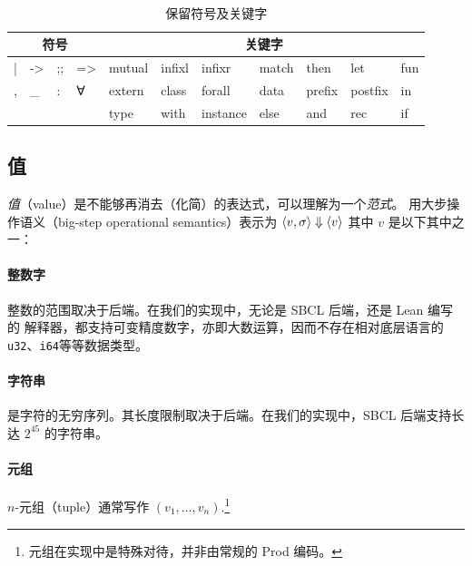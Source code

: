 \documentclass[a4paper, 11pt]{article}
\theoremstyle{remark}\newtheorem*{remark}{Remark}
\theoremstyle{definition}\newtheorem*{definition}{Definition}
\begin{document}
\begin{table}[]
  \centering
  {\tt
    \begin{tabular}{@{}lllllllllll@{}}
      \toprule
      \multicolumn{4}{c}{\textrm{符号}}                & \multicolumn{7}{c}{\textrm{关键字}}                                \\ \midrule
      | & -\textgreater{} & ;; & =\textgreater{} & mutual & infixl & infixr   & match & then   & let     & fun \\
      , & \_              & :  & ∀          & extern & class  & forall   & data  & prefix & postfix & in  \\
      &                 &    &                 & type   & with   & instance & else  & and    & rec     & if \\ \bottomrule
  \end{tabular}}
  \caption{保留符号及关键字}\label{tab:reserved-symbols}
\end{table}

\subsection{值}
\emph{值}（value）是不能够再消去（化简）的表达式，可以理解为一个\emph{范式}。
用大步操作语义（big-step operational semantics）表示为
\(\langle v, \sigma \rangle \Downarrow \langle v \rangle\) 其中 \(v\) 是以下其中之一：
\paragraph*{整数字} 整数的范围取决于后端。在我们的实现中，无论是 SBCL 后端，还是 Lean 编写的
解释器，都支持可变精度数字，亦即大数运算，因而不存在相对底层语言的\texttt{u32}、\texttt{i64}等等数据类型。
\paragraph*{字符串} 是字符的无穷序列。其长度限制取决于后端。在我们的实现中，SBCL 后端支持长达 $2^{45}$ 的字符串。
\paragraph*{元组} \(n\)-元组（tuple）通常写作 \((v_1,\dots,v_n)\).\footnote{元组在实现中是特殊对待，并非由常规的 \textsf{Prod} 编码。}
\end{document}
